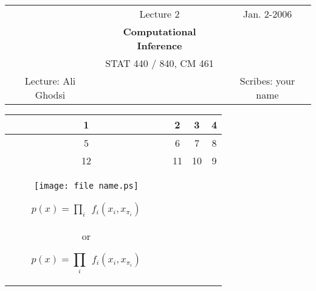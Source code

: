 \documentclass[12pt,twosided,titlepage]{article}
\begin{document}
\begin{tabular}{|c c c|}
\hline
& Lecture 2 & Jan. 2-2006 \\
& \textbf{Computational Inference}  &  \\
& {\small STAT 440 / 840, CM 461} &  \\
Lecture: Ali Ghodsi & & Scribes: your name \\
\hline
\end{tabular}


\begin{tabular}{|c|c|c|c|}
  \hline
  1 & 2 & 3 & 4 \\
  \hline
  5 & 6 & 7 & 8 \\
  12 & 11 & 10 & 9 \\
  \hline

\begin{figure}[h]
\center
\texttt{[image: file name.ps]}
\caption{ } \label{fig1}
\end{figure}

\begin{eqnarray}
  p(x) = \prod_i~~ f_i(x_i, x_{{\pi}_i} )
\end{eqnarray}

or

\[
  p(x) = \prod_i~~ f_i(x_i, x_{{\pi}_i} )
\]

\end{tabular}
\end{document}
